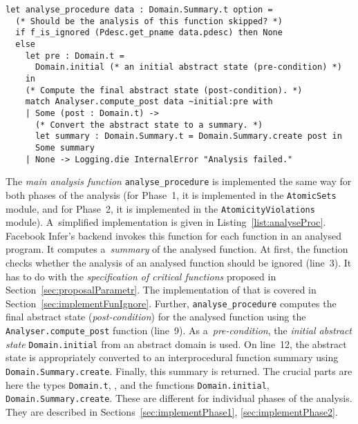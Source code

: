 \begin{lstlisting}[style=ocaml, label={list:analyseProc}, float=hbt, caption={The \emph{main analysis function} for analysing individual functions in a~given program}]
let analyse_procedure data : Domain.Summary.t option =
  (* Should be the analysis of this function skipped? *)
  if f_is_ignored (Pdesc.get_pname data.pdesc) then None
  else
    let pre : Domain.t = 
      Domain.initial (* an initial abstract state (pre-condition) *)
    in
    (* Compute the final abstract state (post-condition). *)
    match Analyser.compute_post data ~initial:pre with
    | Some (post : Domain.t) ->
      (* Convert the abstract state to a summary. *)
      let summary : Domain.Summary.t = Domain.Summary.create post in
      Some summary
    | None -> Logging.die InternalError "Analysis failed."
\end{lstlisting}

The \emph{main analysis function} \texttt{analyse\_procedure} is implemented the same way for both phases of the analysis (for Phase~1, it is implemented in the \texttt{AtomicSets} module, and for Phase~2, it is implemented in the \texttt{AtomicityViolations} module). A~simplified implementation is given in Listing~\ref{list:analyseProc}. Facebook Infer's backend invokes this function for each function in an analysed program. It computes a~\emph{summary} of the analysed function. At first, the function checks whether the analysis of an analysed function should be ignored (line~3). It has to do with the \emph{specification of critical functions} proposed in Section~\ref{sec:proposalParametr}. The implementation of that is covered in Section~\ref{sec:implementFunIgnore}. Further, \texttt{analyse\_procedure} computes the final abstract state (\emph{post-condition}) for the analysed function using the \texttt{Analyser.compute\_post} function (line~9). As a~\emph{pre-condition}, the \emph{initial abstract state} \texttt{Domain.initial} from an abstract domain is used. On line~12, the abstract state is appropriately converted to an interprocedural function summary using \texttt{Domain.Summary.create}. Finally, this summary is returned. The crucial parts are here the types \texttt{Domain.t}, , and the functions \texttt{Domain.initial}, \texttt{Domain.Summary.create}. These are different for individual phases of the analysis. They are described in Sections~\ref{sec:implementPhase1}, \ref{sec:implementPhase2}.

